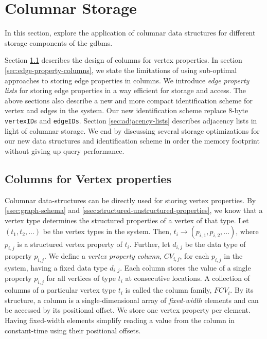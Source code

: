 \chapter{Columnar Storage}
\label{c:columnar-storage}

In this section,   explore the application of columnar data structures for different storage components of the \gls{gdbms}. 

Section \ref{sec:vertex-property-columns} describes the design of columns for vertex properties. In section \ref{sec:edge-property-columns}, we state the limitations of using sub-optimal approaches to storing edge properties in columns. We introduce \emph{edge property lists} for storing edge properties in a way efficient for storage and access. The above sections also describe a new and more compact identification scheme for vertex and edges in the system. Our new identification scheme replace 8-byte \texttt{vertexID}s and \texttt{edgeIDs}. Section \ref{sec:adjacency-lists} describes adjacency lists in light of columnar storage. We end by discussing several storage optimizations for our new data structures and identification scheme in order the memory footprint without giving up query performance.

\section{Columns for Vertex properties}
\label{sec:vertex-property-columns}

Columnar data-structures can be directly used for storing vertex properties. By \ref{ssec:graph-schema} and \ref{ssec:structured-unstructured-properties}, we know that a vertex type determines the structured properties of a vertex of that type. Let $(t_1, t_2, ...)$ be the vertex types in the system. Then, $t_i \rightarrow (p_{i,1},  p_{i,2}, ...)$, where $p_{i, j}$ is a structured vertex property of $t_i$. Further, let $d_{i,j}$ be the data type of property $p_{i,j}$. We define a \emph{vertex property column}, $CV_{i,j}$, for each $p_{i,j}$ in the system, having a fixed data type $d_{i,j}$. Each column stores the value of a single property $p_{i,j}$ for all vertices of type $t_i$ at consecutive locations. A collection of columns of a particular vertex type $t_i$ is called the column family, $FCV_i$. By its structure, a column is  a single-dimensional array of \emph{fixed-width} elements and can be accessed by its positional offset. We store one vertex property per element. Having fixed-width elements simplify reading a value from the column in constant-time using their positional offsets.

